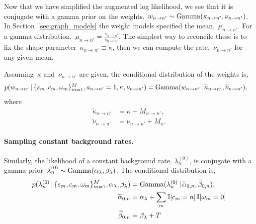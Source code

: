 Now that we have simplified the augmented log likelihood, we see that
it is conjugate with a gamma prior on the weights, ${w_{n \to n'} \sim
  \mathrm{Gamma}(\kappa_{n \to n'}, \nu_{n \to n'}})$.  In
Section~\ref{sec:graph_models} the weight models specified the
mean,~$\mu_{n \to n'}$.  For a gamma distribution,~${\mu_{n \to n'} =
  \frac{\kappa_{n \to n'}}{\nu_{n \to n'}}}$. The simplest way to
reconcile these is to fix the shape parameter~${\kappa_{n \to n'}
  \equiv \kappa}$, then we can compute the rate,~$\nu_{n \to n'}$
for any given mean. 

Assuming~$\kappa$ and~$\nu_{n \to n'}$ are given,
the conditional distribution of the weights is,
\begin{align*}
  p(w_{n \to n'}\,|\, \{s_m,c_m,\omega_m\}_{m=1}^M, a_{n\to n'}=1, \kappa, \nu_{n \to n'})
  &= 
  \mathrm{Gamma}(w_{n \to n'} \,|\, \widetilde{\kappa}_{n \to n'}, \widetilde{\nu}_{n \to n'}),
\end{align*}
where
\begin{align*}
  \widetilde{\kappa}_{n \to n'} &= \kappa + M_{n \to n'}, \\
  \widetilde{\nu}_{n \to n'} &= \nu_{n \to n'} + M_n.
\end{align*}


\paragraph{Sampling constant background rates.}
Similarly, the likelihood of a constant background rate,
${\lambda^{(0)}_{n}}$, is conjugate with a gamma
prior~${\lambda^{(0)}_{n} \sim
  \mathrm{Gamma}(\alpha_{\lambda},\beta_{\lambda})}$.  The conditional
distribution is,
\begin{align*}
  p(\lambda^{(0)}_{n} \,|\, \{s_m,c_m, \omega_m\}_{m=1}^M, \alpha_\lambda, \beta_\lambda)
  &=
  \mathrm{Gamma}(\lambda^{(0)}_{n} \,|\, \widetilde{\alpha}_{0,n},  \widetilde{\beta}_{0,n}),\\
  \widetilde{\alpha}_{0,n} &= \alpha_{\lambda} + \sum_m \mathbb{I}[c_m = n] \, \mathbb{I}[\omega_m=0] \\
  \widetilde{\beta}_{0,n} &= \beta_\lambda + T
\end{align*}



